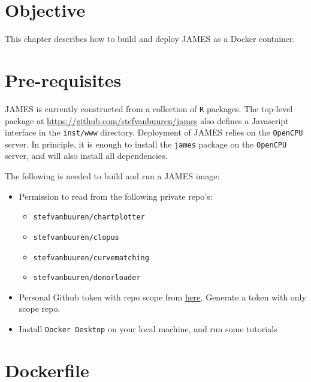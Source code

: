 \documentclass[
]{book}
\providecommand{\tightlist}{%
  \setlength{\itemsep}{0pt}\setlength{\parskip}{0pt}}
\begin{document}
\hypertarget{objective-1}{%
\section{Objective}\label{objective-1}}

This chapter describes how to build and deploy JAMES as a Docker container.

\hypertarget{pre-requisites}{%
\section{Pre-requisites}\label{pre-requisites}}

JAMES is currently constructed from a collection of \texttt{R} packages. The top-level package at \url{https://github.com/stefvanbuuren/james} also defines a Javascript interface in the \texttt{inst/www} directory. Deployment of JAMES relies on the \texttt{OpenCPU} server. In principle, it is enough to install the \texttt{james} package on the \texttt{OpenCPU} server, and will also install all dependencies.

The following is needed to build and run a JAMES image:

\begin{itemize}
\item
  Permission to read from the following private repo's:

  \begin{itemize}
  \tightlist
  \item
    \texttt{stefvanbuuren/chartplotter}
  \item
    \texttt{stefvanbuuren/clopus}
  \item
    \texttt{stefvanbuuren/curvematching}
  \item
    \texttt{stefvanbuuren/donorloader}
  \end{itemize}
\item
  Personal Github token with repo scope from \href{https://help.github.com/en/github/authenticating-to-github/creating-a-personal-access-token-for-the-command-line}{here}, Generate a token with only scope repo.
\item
  Install \texttt{Docker\ Desktop} on your local machine, and run some tutorials
\end{itemize}

\hypertarget{dockerfile}{%
\section{Dockerfile}\label{dockerfile}}
\end{document}
